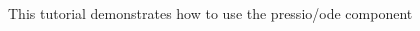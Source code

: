 

\begin{DoxyParagraph}{}
This tutorial demonstrates how to use the pressio/ode component
\end{DoxyParagraph}

\begin{DoxyCode}{0}

\end{DoxyCode}
 